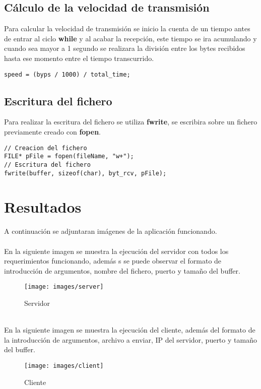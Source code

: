 \documentclass[12pt, letterpaper]{article}
\begin{document}
\subsection{C\'alculo de la velocidad de transmisi\'on}
\noindent Para calcular la velocidad de transmisi\'on se inicio la cuenta de un tiempo antes de entrar al ciclo {\selectfont\textbf{while}} y al acabar la recepci\'on, este tiempo se ira acumulando y cuando sea mayor a 1 segundo se realizara la divisi\'on entre los bytes recibidos hasta ese momento entre el tiempo transcurrido.
\begin{verbatim}
speed = (byps / 1000) / total_time;
\end{verbatim}
\subsection{Escritura del fichero}
\noindent Para realizar la escritura del fichero se utiliza {\selectfont\textbf{fwrite}}, se escribira sobre un fichero previamente creado con {\selectfont\textbf{fopen}}.
\begin{verbatim}
// Creacion del fichero
FILE* pFile = fopen(fileName, "w+");
// Escritura del fichero
fwrite(buffer, sizeof(char), byt_rcv, pFile);
\end{verbatim}

\clearpage
\section{Resultados}
\noindent A continuaci\'on se adjuntaran im\'agenes de la aplicaci\'on funcionando.
\\~\\
En la siguiente imagen se muestra la ejecuci\'on del servidor con todos los requerimientos funcionando, adem\'as s se puede observar el formato de introducci\'on de argumentos, nombre del fichero, puerto y tamaño del buffer.
\begin{figure}[h!]
	\centering
	\texttt{[image: images/server]}
	\caption{Servidor}
	\label{fig:server}
\end{figure}
\\En la siguiente imagen se muestra la ejecuci\'on del cliente, adem\'as del formato de la introducci\'on de argumentos, archivo a enviar, IP del servidor, puerto y tamaño del buffer.
\begin{figure}[h!]
	\centering
	\texttt{[image: images/client]}
	\caption{Cliente}
	\label{fig:client}
\end{figure}
\end{document}
